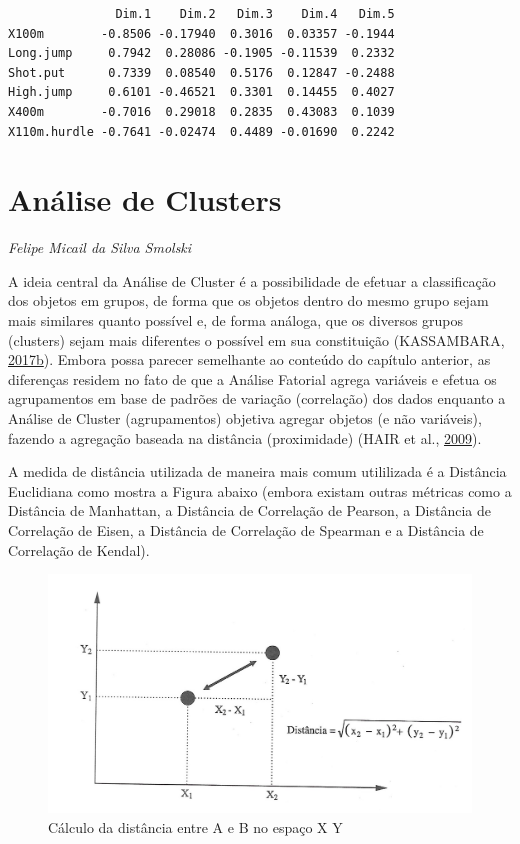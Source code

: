 \documentclass[12pt,brazil,oneside]{book}
\begin{document}
\begin{verbatim}
               Dim.1    Dim.2   Dim.3    Dim.4   Dim.5
X100m        -0.8506 -0.17940  0.3016  0.03357 -0.1944
Long.jump     0.7942  0.28086 -0.1905 -0.11539  0.2332
Shot.put      0.7339  0.08540  0.5176  0.12847 -0.2488
High.jump     0.6101 -0.46521  0.3301  0.14455  0.4027
X400m        -0.7016  0.29018  0.2835  0.43083  0.1039
X110m.hurdle -0.7641 -0.02474  0.4489 -0.01690  0.2242
\end{verbatim}

\hypertarget{analise-de-clusters}{%
\chapter{Análise de Clusters}\label{analise-de-clusters}}

\emph{Felipe Micail da Silva Smolski}

\begin{flushright}
\emph{}
\end{flushright}

A ideia central da Análise de Cluster é a possibilidade de efetuar a classificação dos objetos em grupos, de forma que os objetos dentro do mesmo grupo sejam mais similares quanto possível e, de forma análoga, que os diversos grupos (clusters) sejam mais diferentes o possível em sua constituição (KASSAMBARA, \protect\hyperlink{ref-Kassambara2017}{2017}\protect\hyperlink{ref-Kassambara2017}{b}). Embora possa parecer semelhante ao conteúdo do capítulo anterior, as diferenças residem no fato de que a Análise Fatorial agrega variáveis e efetua os agrupamentos em base de padrões de variação (correlação) dos dados enquanto a Análise de Cluster (agrupamentos) objetiva agregar objetos (e não variáveis), fazendo a agregação baseada na distância (proximidade) (HAIR et al., \protect\hyperlink{ref-Hair2009}{2009}).

A medida de distância utilizada de maneira mais comum utililizada é a Distância Euclidiana como mostra a Figura abaixo (embora existam outras métricas como a Distância de Manhattan, a Distância de Correlação de Pearson, a Distância de Correlação de Eisen, a Distância de Correlação de Spearman e a Distância de Correlação de Kendal).

\begin{figure}[H]

{\centering \includegraphics[width=0.8\linewidth]{distecludiana} 

}

\caption{Cálculo da distância entre A e B no espaço X Y}\label{fig:unnamed-chunk-47}
\end{figure}
\end{document}
